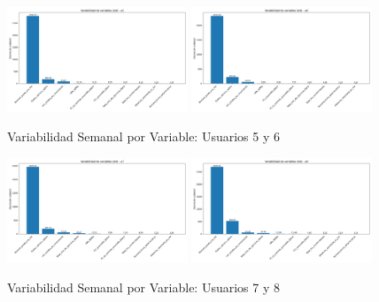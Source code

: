 \documentclass[12pt,letterpaper,twoside]{report}
\begin{document}
\begin{figure}[H]
\centering
\includegraphics[width=0.48\textwidth]{figuras/variabilidad_variables_u5.png}
\includegraphics[width=0.48\textwidth]{figuras/variabilidad_variables_u6.png}
\caption{Variabilidad Semanal por Variable: Usuarios 5 y 6}
\end{figure}

\begin{figure}[H]
\centering
\includegraphics[width=0.48\textwidth]{figuras/variabilidad_variables_u7.png}
\includegraphics[width=0.48\textwidth]{figuras/variabilidad_variables_u8.png}
\caption{Variabilidad Semanal por Variable: Usuarios 7 y 8}
\end{figure}
\end{document}
